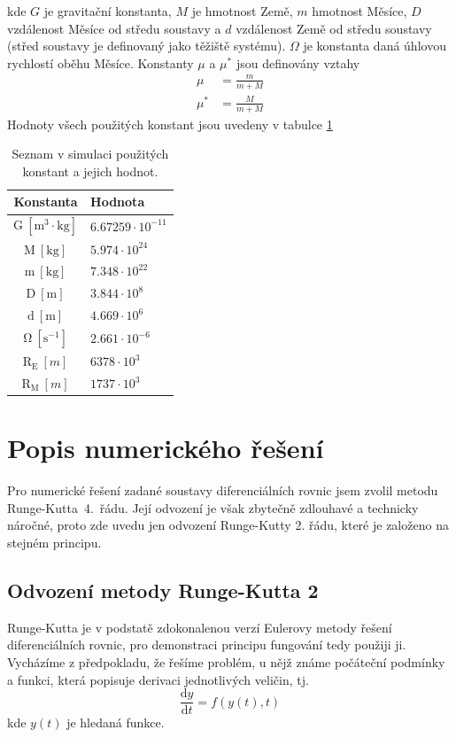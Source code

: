 \documentclass[a4paper,11pt]{article}
\begin{document}
kde $G$ je gravitační konstanta, $M$ je hmotnost Země, $m$ hmotnost Měsíce, $D$ vzdálenost Měsíce od středu soustavy a $d$ vzdálenost Země od středu
soustavy (střed soustavy je definovaný jako těžiště systému). $\Omega$ je konstanta daná úhlovou rychlostí oběhu Měsíce.
Konstanty $\mu$ a $\mu^*$ jsou definovány vztahy
\begin{align*}
    \mu &= \frac{m}{m + M} \\
    \mu^* &= \frac{M}{m + M}
\end{align*}
Hodnoty všech použitých konstant jsou uvedeny v tabulce \ref{tab:constants}
\begin{table}
    \centering
    \begin{tabular}{c|l}
        \textbf{Konstanta} & \textbf{Hodnota} \\ \hline
        $\mathrm{G \ [m^3 \cdot kg]}$ & $6.67259\cdot 10^{-11}$ \\
        $\mathrm{M \ [kg]}$ & $5.974 \cdot 10^{24}$ \\
        $\mathrm{m \ [kg]}$ & $7.348 \cdot 10^{22}$ \\
        $\mathrm{D \ [m]}$ & $3.844 \cdot 10^{8}$ \\
        $\mathrm{d \ [m]}$ & $4.669 \cdot 10^{6}$ \\
        $\mathrm{\Omega \ [s^{-1}]}$ & $2.661 \cdot 10^{-6}$ \\
        $\mathrm{R_E} \ [m]$ & $6378 \cdot 10^3$ \\
        $\mathrm{R_M} \ [m]$ & $1737 \cdot 10^3$
    \end{tabular}
    \caption{Seznam v simulaci použitých konstant a jejich hodnot.}
    \label{tab:constants}
\end{table}

\section{Popis numerického řešení}

Pro numerické řešení zadané soustavy diferenciálních rovnic jsem zvolil metodu Runge-Kutta~4.~řádu.
Její odvození je však zbytečně zdlouhavé a technicky náročné, proto zde uvedu
jen odvození Runge-Kutty 2. řádu, které je založeno na stejném principu.

\subsection{Odvození metody Runge-Kutta 2}

Runge-Kutta je v podstatě zdokonalenou verzí Eulerovy metody řešení diferenciálních rovnic,
pro demonstraci principu fungování tedy použiji ji. Vycházíme z předpokladu, že řešíme
problém, u nějž známe počáteční podmínky a funkci, která popisuje derivaci jednotlivých veličin, tj.
\begin{equation*}
    \frac{\mathrm{d} y}{\mathrm{d} t} = f(y(t), t)
\end{equation*}
kde $y(t)$ je hledaná funkce.
\end{document}
